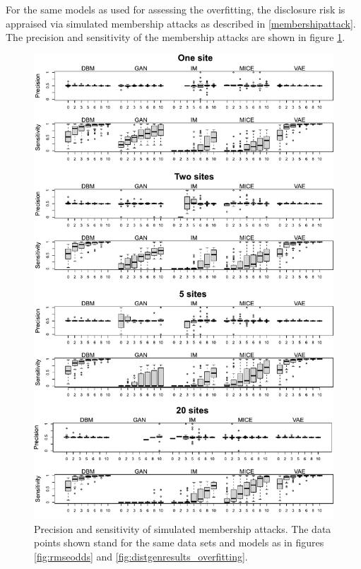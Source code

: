 \documentclass[12pt]{article}
\begin{document}
For the same models as used for assessing the overfitting, the disclosure risk is appraised via simulated membership attacks as described in \ref{membershipattack}.
The precision and sensitivity of the membership attacks are shown in figure \ref{fig:membershipattack}.
 

\begin{figure}[h]
\centering
\includegraphics[scale=0.7]{images/membership_combined.pdf}
\caption{Precision and sensitivity of simulated membership attacks.  The data points shown stand for the same data sets and models as in figures \ref{fig:rmseodds} and \ref{fig:distgenresults_overfitting}.}
\label{fig:membershipattack}
\end{figure} 
 
\end{document}
